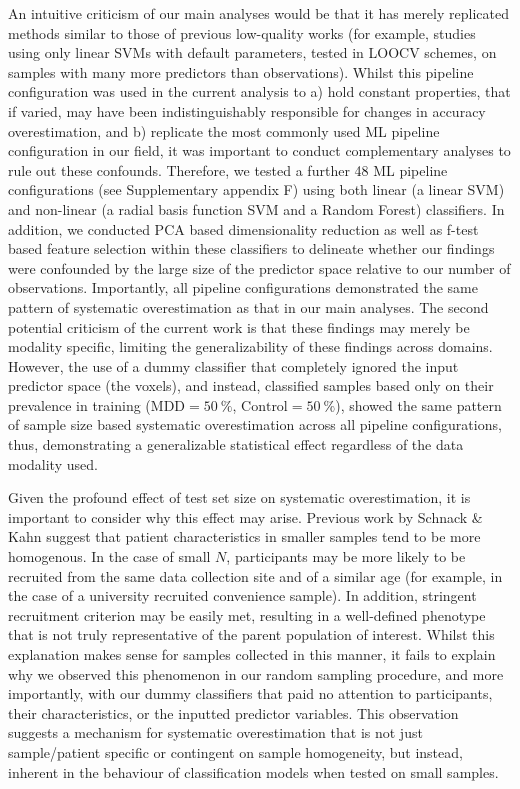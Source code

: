 \documentclass{article}
\begin{document}
    An intuitive criticism of our main analyses would be that it has merely replicated methods similar to those of previous low-quality works (for example, studies using only linear SVMs with default parameters, tested in LOOCV schemes, on samples with many more predictors than observations). Whilst this pipeline configuration was used in the current analysis to a) hold constant properties, that if varied, may have been indistinguishably responsible for changes in accuracy overestimation, and b) replicate the most commonly used ML pipeline configuration in our field, it was important to conduct complementary analyses to rule out these confounds. Therefore, we tested a further 48 ML pipeline configurations (see Supplementary appendix F) using both linear (a linear SVM) and non-linear (a radial basis function SVM and a Random Forest) classifiers. In addition, we conducted PCA based dimensionality reduction as well as f-test based feature selection within these classifiers to delineate whether our findings were confounded by the large size of the predictor space relative to our number of observations. Importantly, all pipeline configurations demonstrated the same pattern of systematic overestimation as that in our main analyses. The second potential criticism of the current work is that these findings may merely be modality specific, limiting the generalizability of these findings across domains. However, the use of a dummy classifier that completely ignored the input predictor space (the voxels), and instead, classified samples based only on their prevalence in training ($\text{MDD}=\SI{50}{\percent}$, $\text{Control}=\SI{50}{\percent}$), showed the same pattern of sample size based systematic overestimation across all pipeline configurations, thus, demonstrating a generalizable statistical effect regardless of the data modality used.

    Given the profound effect of test set size on systematic overestimation, it is important to consider why this effect may arise. Previous work by Schnack \& Kahn\cite{Schnack2016} suggest that patient characteristics in smaller samples tend to be more homogenous. In the case of small $N$, participants may be more likely to be recruited from the same data collection site and of a similar age (for example, in the case of a university recruited convenience sample). In addition, stringent recruitment criterion may be easily met, resulting in a well-defined phenotype that is not truly representative of the parent population of interest. Whilst this explanation makes sense for samples collected in this manner, it fails to explain why we observed this phenomenon in our random sampling procedure, and more importantly, with our dummy classifiers that paid no attention to participants, their characteristics, or the inputted predictor variables. This observation suggests a mechanism for systematic overestimation that is not just sample/patient specific or contingent on sample homogeneity, but instead, inherent in the behaviour of classification models when tested on small samples.
\end{document}
